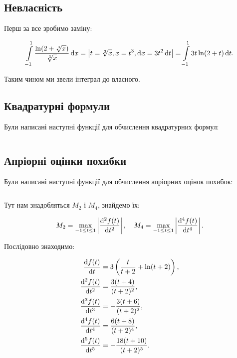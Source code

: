 \subsection{Невласність}

Перш за все зробимо заміну:

\begin{equation}
	\displaystyle\int\limits_{-1}^1 \frac{\ln(2 + \sqrt[3]{x})}{\sqrt[3]{x}} \mathop{}\!\mathrm{d} x = \left| t = \sqrt[3]{x}, x = t^3, \mathop{}\!\mathrm{d} x = 3 t^2 \mathop{}\!\mathrm{d} t \right| = \displaystyle\int\limits_{-1}^1 3 t \ln(2 + t) \mathop{}\!\mathrm{d} t.
\end{equation}

Таким чином ми звели інтеграл до власного.

\subsection{Квадратурні формули}

Були написані наступні функції для обчислення квадратурних формул:

\inputminted[firstline=6]{python}{../py/integrate.py}

\subsection{Апріорні оцінки похибки}

Були написані наступні функції для обчислення апріорних оцінок похибок:

\inputminted[firstline=4]{python}{../py/apriori_error.py}

Тут нам знадобляться $M_2$ і $M_4$, знайдемо їх:

\begin{equation}
	M_2 = \displaystyle\max\limits_{-1 \le t \le 1} \left| \frac{\mathop{}\!\mathrm{d}^2 f(t)}{\mathop{}\!\mathrm{d} t^2} \right|, \quad M_4 = \displaystyle\max\limits_{-1 \le t \le 1} \left| \frac{\mathop{}\!\mathrm{d}^4 f(t)}{\mathop{}\!\mathrm{d} t^4} \right|.
\end{equation}

Послідовно знаходимо:

\begin{align}
	\frac{\diff f(t)}{\diff t} &= 3 \left( \frac{t}{t + 2} + \ln (t + 2) \right), \\
	\frac{\diff^2 f(t)}{\diff t^2} &= \frac{3 (t + 4)}{(t + 2)^2}, \\
	\frac{\diff^3 f(t)}{\diff t^3} &= - \frac{3 (t + 6)}{(t + 2)^2}, \\
	\frac{\diff^4 f(t)}{\diff t^4} &= \frac{6 (t + 8)}{(t + 2)^4}, \\
	\frac{\diff^5 f(t)}{\diff t^5} &= - \frac{18 (t + 10)}{(t + 2)^5}.
\end{align}

